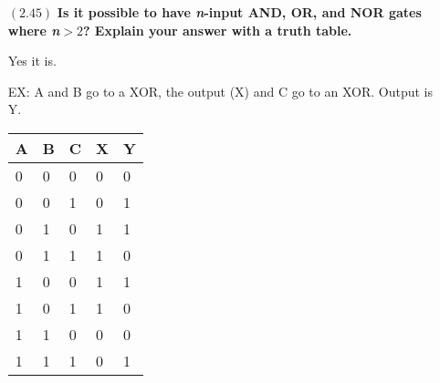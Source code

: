\documentclass[letterpaper,10pt,titlepage]{article}
\begin{document}
\begin{enumerate}
\item[$(2.45)$] \textbf{Is it possible to have \textit{n}-input  AND, OR, and NOR gates where \textit{n}$>2$? Explain your answer with a truth table.}

  Yes it is.

  EX: A and B go to a XOR, the output (X) and C go to an XOR. Output is Y.
\begin{center}
	\begin{tabular}{ | l l l || l  l |}
	\hline
	A & B & C & X & Y \\ \hline
	0 & 0 & 0 & 0 & 0 \\ \hline
	0 & 0 & 1 & 0 & 1 \\ \hline
	0 & 1 & 0 & 1 & 1 \\ \hline
	0 & 1 & 1 & 1 & 0 \\ \hline 
	1 & 0 & 0 & 1 & 1 \\ \hline
	1 & 0 & 1 & 1 & 0 \\ \hline
	1 & 1 & 0 & 0 & 0 \\ \hline
	1 & 1 & 1 & 0 & 1 \\ \hline 
	\end{tabular}
\end{center}

\end{enumerate}
\end{document}
